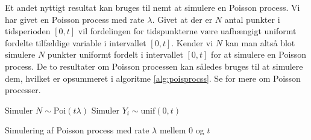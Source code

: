 Et andet nyttigt resultat kan bruges til nemt at simulere en Poisson process. Vi har givet en Poisson process med rate $\lambda$. Givet at der er $N$ antal punkter i tidsperioden $[0,t]$ vil fordelingen for tidspunkterne være uafhængigt uniformt fordelte tilfældige variable i intervallet $[0,t]$. Kender vi $N$ kan man altså blot simulere $N$ punkter uniformt fordelt i intervallet $[0,t]$ for at simulere en Poisson process. De to resultater om Poisson processen kan således bruges til at simulere dem, hvilket er opsummeret i algoritme \ref{alg:poisprocss}. Se \cite[240-247]{olofsson2012} for mere om Poisson processer. 
\begin{algorithm}
\begin{algorithmic}
\STATE Simuler $N \sim \text{Poi}(t\lambda)$ 
\STATE Simuler $Y_i \sim \text{unif}(0,t)$ 
\ENDFOR 
\end{algorithmic}
\caption{Simulering af Poisson process med rate $\lambda$ mellem $0$ og $t$} \label{alg:poisprocss}
\end{algorithm}